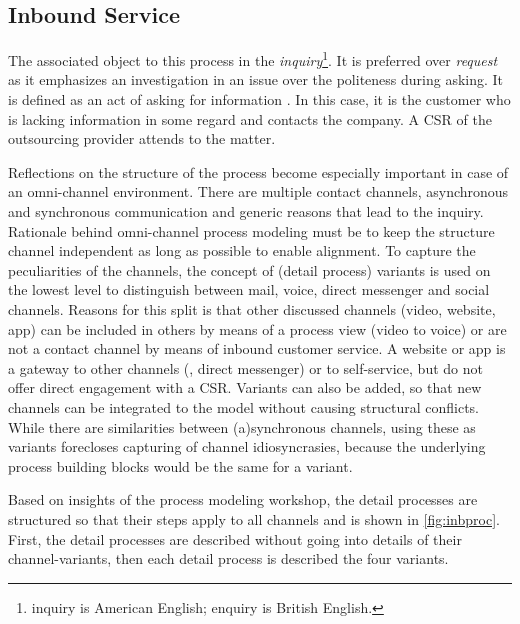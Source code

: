 	 
	 
	 \subsection{Inbound Service}
	 The associated object to this process in the \textit{inquiry}\footnote{inquiry is American English; enquiry is British English.}. It is preferred over \textit{request} as it emphasizes an investigation in an issue over the politeness during asking. It is defined as an act of asking for information \citep{oxfordenquiry, oxfordrequest}. In this case, it is the customer who is lacking information in some regard and contacts the company. A \acrshort{CSR} of the outsourcing provider attends to the matter. 
	 
	 Reflections on the structure of the process become especially important in case of an omni-channel environment. There are multiple contact channels, asynchronous and synchronous communication and generic reasons that lead to the inquiry. Rationale behind omni-channel process modeling must be to keep the structure channel independent as long as possible to enable alignment. To capture the peculiarities of the channels, the concept of (detail process) variants is used on the lowest level to distinguish between mail, voice, direct messenger and social channels. Reasons for this split is that other discussed channels (video, website, app) can be included in others by means of a process view (video to voice) or are not a contact channel by means of inbound customer service. A website or app is a gateway to other channels (\eg, direct messenger) or to self-service, but do not offer direct engagement with a \acrshort{CSR}. Variants can also be added, so that new channels can be integrated to the model without causing structural conflicts. While there are similarities between (a)synchronous channels, using these as variants forecloses capturing of channel idiosyncrasies, because the underlying process building blocks would be the same for a variant. 
	 
	 Based on insights of the process modeling workshop, the detail processes are structured so that their steps apply to all channels and is shown in \Fig \ref{fig:inbproc}. First, the detail processes are described without going into details of their channel-variants, then each detail process is described \wrt the four variants. 
	 
